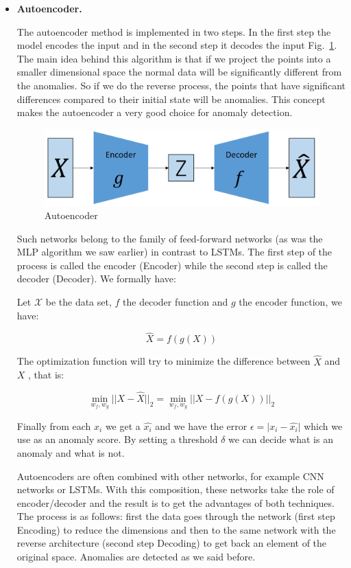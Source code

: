 \documentclass[a4paper,12pt]{report}
\theoremstyle{definitionNODot}
\begin{document}
\begin{itemize}
		\item \textbf{Autoencoder.}
		
		The autoencoder method is implemented in two steps. In the first step the model encodes the input and in the second step it decodes the input Fig.~\ref{fig:autoencoder}. The main idea behind this algorithm is that if we project the points into a smaller dimensional space the normal data will be significantly different from the anomalies. So if we do the reverse process, the points that have significant differences compared to their initial state will be anomalies. This concept makes the autoencoder a very good choice for anomaly detection.
		
		\begin{figure}[h]
			\centering
			\includegraphics[width=\textwidth]{autoencoder.png}
			\caption{Autoencoder}
			\label{fig:autoencoder}
		\end{figure}
		
		Such networks belong to the family of feed-forward networks (as was the MLP algorithm we saw earlier) in contrast to LSTMs. The first step of the process is called the encoder (Encoder) while the second step is called the decoder (Decoder). We formally have:
		
		Let $\mathcal{X}$ be the data set, $f$ the decoder function and $g$ the encoder function, we have:
		
		$$\hat{X} = f(g(X))$$
		
		The optimization function will try to minimize the difference between $\hat{X}$ and $X$ , that is:
		
		$$\min_{w_f, w_g} \lvert \lvert X - \hat{X} \rvert \rvert_2  = \min_{w_f, w_g} \lvert \lvert X - f(g(X)) \rvert \rvert_2$$
		
		Finally from each $x_i$ we get a $\hat{x_i}$ and we have the error $\epsilon = \lvert x_i - \hat{x_i} \rvert$ which we use as an anomaly score. By setting a threshold $\delta$ we can decide what is an anomaly and what is not.
		
		Autoencoders are often combined with other networks, for example CNN networks or LSTMs. With this composition, these networks take the role of encoder/decoder and the result is to get the advantages of both techniques. The process is as follows: first the data goes through the network (first step Encoding) to reduce the dimensions and then to the same network with the reverse architecture (second step Decoding) to get back an element of the original space. Anomalies are detected as we said before.
		

\end{itemize}
\end{document}
